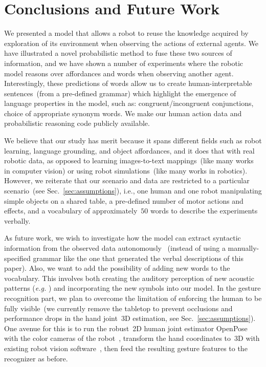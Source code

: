 
\section{Conclusions and Future Work}
\label{sec:conclusions}

We presented a model that allows a robot to reuse the knowledge acquired by exploration of its environment when observing the actions of external agents.
We have illustrated a novel probabilistic method to fuse these two sources of information, and we have shown a number of experiments where the robotic model reasons over affordances and words when observing another agent.
Interestingly, these predictions of words allow us to create human-interpretable sentences~(from a pre-defined grammar) which highlight the emergence of language properties in the model, such as:
congruent/incongruent conjunctions,
choice of appropriate synonym words. %
We make our human action data and probabilistic reasoning code publicly available.

We believe that our study has merit because it spans different fields such as robot learning, language grounding, and object affordances, and it does that with real robotic data, as opposed to learning images-to-text mappings~(like many works in computer vision) or using robot simulations~(like many works in robotics).
However, we reiterate that our scenario and data are restricted to a particular scenario~(see Sec.~\ref{sec:assumptions}), i.e., one human and one robot manipulating simple objects on a shared table, a pre-defined number of motor actions and effects, and a vocabulary of approximately~$50$ words to describe the experiments verbally.

As future work, we wish to investigate how the model can extract syntactic information from the observed data autonomously
~(instead of using a manually-specified grammar like the one that generated the verbal descriptions of this paper).
Also, we want to add the possibility of adding new words to the vocabulary.
This involves both creating the auditory perception of new acoustic patterns (\textit{e.g.} \cite{falstrom:2017:glu, vanhainen2014:icassp, vanhainen:2012:interspeech}) and incorporating the new symbols into our \AffWords{} model.
In the gesture recognition part, we plan to overcome the limitation of enforcing the human to be fully visible~(we currently remove the tabletop to prevent occlusions and performance drops in the hand joint~3D estimation, see Sec.~\ref{sec:assumptions}).
One avenue for this is to run the robust~2D human joint estimator OpenPose with the color cameras of the robot~\cite{cao:2017:openpose-cpvr}, transform the hand coordinates to~3D with existing robot vision software~\cite{roncone:2016:rss}, then feed the resulting gesture features to the recognizer as before.

